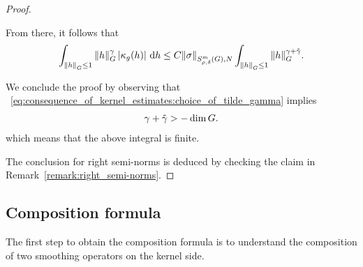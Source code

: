 \begin{proof}
\begin{description}
            From there, it follows that
            \begin{align*}
                \int_{\norm [\Group] h \leq 1} \norm [\Group] h^\gamma \abs {\kappa_g(h)} \dd h \leq
                C \SymbolSemiNorm m {\rho, \delta} N \sigma
                \int_{\norm [\Group] h \leq 1}
                \norm [\Group] h^{\gamma + \tilde \gamma}.
            \end{align*}

            We conclude the proof by observing that ~\eqref{eq:consequence_of_kernel_estimates:choice_of_tilde_gamma}
            implies
            \begin{align*}
                \gamma + \tilde \gamma > -\dim \Group.
            \end{align*}
            which means that the above integral is finite.
    \end{description}

    The conclusion for right semi-norms is deduced by checking the claim in Remark~\ref{remark:right_semi-norms}.
\end{proof}

\subsection{Composition formula}

The first step to obtain the composition formula
is to understand the composition of two smoothing operators on the kernel side.

